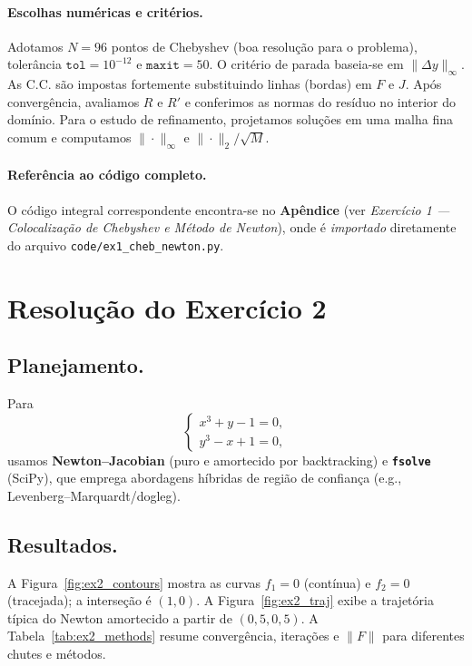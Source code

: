\documentclass[12pt,a4paper]{article}
\begin{document}
\paragraph{Escolhas numéricas e critérios.}
Adotamos \(N=96\) pontos de Chebyshev (boa resolução para o problema), tolerância \(\texttt{tol}=10^{-12}\) e \(\texttt{maxit}=50\). 
O critério de parada baseia-se em \(\|\Delta y\|_\infty\). As C.C. são impostas fortemente substituindo linhas (bordas) em \(F\) e \(J\).
Após convergência, avaliamos \(R\) e \(R'\) e conferimos as normas do resíduo no interior do domínio.
Para o estudo de refinamento, projetamos soluções em uma malha fina comum e computamos \(\|\cdot\|_\infty\) e \(\|\cdot\|_2/\sqrt{M}\).

\paragraph{Referência ao código completo.}
O código integral correspondente encontra-se no \textbf{Apêndice} (ver \emph{Exercício 1 — Colocalização de Chebyshev e Método de Newton}), 
onde é \emph{importado} diretamente do arquivo \texttt{code/ex1\_cheb\_newton.py}.


\section{Resolução do Exercício 2}

\subsection{Planejamento.}
Para
\[
\begin{cases}
x^3 + y - 1 = 0,\\
y^3 - x + 1 = 0,
\end{cases}
\]
usamos \textbf{Newton--Jacobian} (puro e amortecido por backtracking) e \textbf{\texttt{fsolve}} (SciPy), que emprega abordagens híbridas de região de confiança (e.g., Levenberg--Marquardt/dogleg).

\subsection{Resultados.}
A Figura~\ref{fig:ex2_contours} mostra as curvas $f_1=0$ (contínua) e $f_2=0$ (tracejada); a interseção é \((1,0)\).
A Figura~\ref{fig:ex2_traj} exibe a trajetória típica do Newton amortecido a partir de $(0{,}5,0{,}5)$.
A Tabela~\ref{tab:ex2_methods} resume convergência, iterações e $\|F\|$ para diferentes chutes e métodos.
\end{document}
